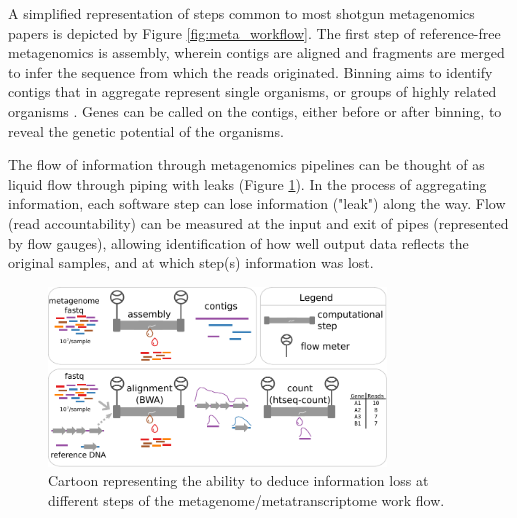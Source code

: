 A simplified representation of steps common to most shotgun metagenomics papers is depicted by Figure \ref{fig:meta_workflow}.
The first step of reference-free metagenomics is assembly, wherein contigs are aligned and fragments are merged to infer the sequence from which the reads originated.
Binning aims to identify contigs that in aggregate represent single organisms, or groups of highly related organisms \cite{kunin2008}.
Genes can be called on the contigs, either before or after binning, to reveal the genetic potential of the organisms.

The flow of information through metagenomics pipelines can be thought of as liquid flow through piping with leaks (Figure \ref{fig:pipe_leaks}).
In the process of aggregating information, each software step can lose information ("leak") along the way.
Flow (read accountability) can be measured at the input and exit of pipes (represented by flow gauges), allowing identification of how well output data reflects the original samples, and at which step(s) information was lost.

\begin{figure}[H]
\centering
    \includegraphics[width=0.8\textwidth]{./tex/chapter2/figures/170312_pipe_leaks.pdf}
    \begin{singlespace}
    \caption[Framework for assessing information loss in workflow steps]{
        Cartoon representing the ability to deduce information loss at different steps of the metagenome/metatranscriptome work flow.}
    \label{fig:pipe_leaks}
    \end{singlespace}
\end{figure}

